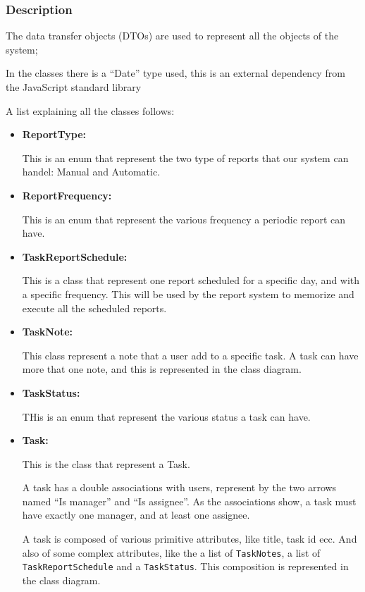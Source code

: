 \documentclass{article}
\begin{document}
\subsubsection{Description}

The data transfer objects (DTOs) are used to represent
all the objects of the system;

In the classes there is a ``Date'' type used, this is an external dependency
from the JavaScript standard library

A list explaining all the classes follows:

\begin{itemize}
    \item \textbf{ReportType: }

    This is an enum that represent the two type of reports that our system can handel: Manual and Automatic.

    \item \textbf{ReportFrequency: }

    This is an enum that represent the various frequency a periodic report can have.

    \item \textbf{TaskReportSchedule: }

    This is a class that represent one report scheduled for a specific day, and with a specific frequency.
    This will be used by the report system to memorize and execute all the scheduled reports.

    \item \textbf{TaskNote: }
    
    This class represent a note that a user add to a specific task.
    A task can have more that one note, and this is represented in the class diagram.

    \item \textbf{TaskStatus: }
    
    THis is an enum that represent the various status a task can have.

    \item \textbf{Task: }
    
    This is the class that represent a Task.

    A task has a double associations with users, represent by the two arrows named ``Is manager'' and ``Is assignee''.
    As the associations show, a task must have exactly one manager, and at least one assignee.

    A task is composed of various primitive attributes, like title, task id ecc. 
    And also of some complex attributes, like the a list of \texttt{TaskNotes}, a list of \texttt{TaskReportSchedule} 
    and a \texttt{TaskStatus}. This composition is represented in the class diagram. 


\end{itemize}
\end{document}
